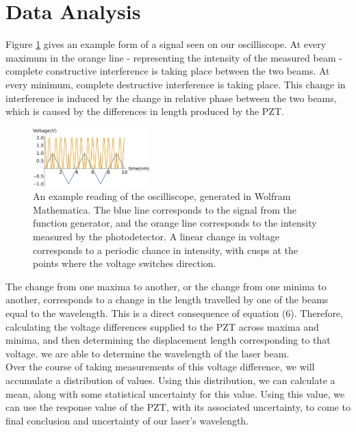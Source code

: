   \section{Data Analysis}
    Figure \ref{fig:waveform} gives an example form of a signal seen on our oscilliscope. At every maximum in the orange line - representing the intensity of the measured beam - complete constructive interference is taking place between the two beams. At every minimum, complete destructive interference is taking place. This change in interference is induced by the change in relative phase between the two beams, which is caused by the differences in length produced by the PZT.
   \begin{figure}[t]
    \includegraphics[width=0.4\textwidth]{waveform.pdf}
    \caption{An example reading of the oscilliscope, generated in Wolfram Mathematica. The blue line corresponds to the signal from the function generator, and the orange line corresponds to the intensity measured by the photodetector. A linear change in voltage corresponds to a periodic chance in intensity, with cusps at the points where the voltage switches direction.}
    \label{fig:waveform}
    \end{figure}
    The change from one maxima to another, or the change from one minima to another, corresponds to a change in the length travelled by one of the beams equal to the wavelength. This is a direct consequence of equation (6). Therefore, calculating the voltage differences supplied to the PZT across maxima and minima, and then determining the displacement length corresponding to that voltage. we are able to determine the wavelength of the laser beam.
    \\
    Over the course of taking measurements of this voltage difference, we will accumulate a distribution of values. Using this distribution, we can calculate a mean, along with some statistical uncertainty for this value. Using this value, we can use the response value of the PZT, with its associated uncertainty, to come to final conclusion and uncertainty of our laser's wavelength.
